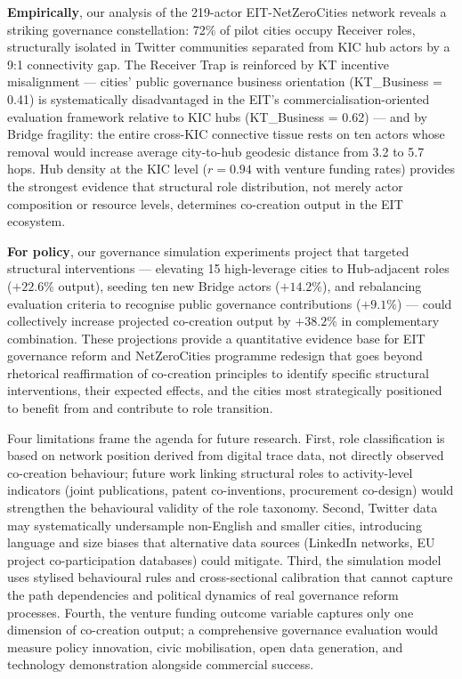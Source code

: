 \documentclass[review,12pt]{elsarticle}
\begin{document}
\textbf{Empirically}, our analysis of the 219-actor EIT-NetZeroCities network reveals a striking governance constellation: 72\% of pilot cities occupy Receiver roles, structurally isolated in Twitter communities separated from KIC hub actors by a 9:1 connectivity gap. The Receiver Trap is reinforced by KT incentive misalignment --- cities' public governance business orientation (KT\_Business = 0.41) is systematically disadvantaged in the EIT's commercialisation-oriented evaluation framework relative to KIC hubs (KT\_Business = 0.62) --- and by Bridge fragility: the entire cross-KIC connective tissue rests on ten actors whose removal would increase average city-to-hub geodesic distance from 3.2 to 5.7 hops. Hub density at the KIC level ($r = 0.94$ with venture funding rates) provides the strongest evidence that structural role distribution, not merely actor composition or resource levels, determines co-creation output in the EIT ecosystem.

\textbf{For policy}, our governance simulation experiments project that targeted structural interventions --- elevating 15 high-leverage cities to Hub-adjacent roles ($+22.6\%$ output), seeding ten new Bridge actors ($+14.2\%$), and rebalancing evaluation criteria to recognise public governance contributions ($+9.1\%$) --- could collectively increase projected co-creation output by $+38.2\%$ in complementary combination. These projections provide a quantitative evidence base for EIT governance reform and NetZeroCities programme redesign that goes beyond rhetorical reaffirmation of co-creation principles to identify specific structural interventions, their expected effects, and the cities most strategically positioned to benefit from and contribute to role transition.

Four limitations frame the agenda for future research. First, role classification is based on network position derived from digital trace data, not directly observed co-creation behaviour; future work linking structural roles to activity-level indicators (joint publications, patent co-inventions, procurement co-design) would strengthen the behavioural validity of the role taxonomy. Second, Twitter data may systematically undersample non-English and smaller cities, introducing language and size biases that alternative data sources (LinkedIn networks, EU project co-participation databases) could mitigate. Third, the simulation model uses stylised behavioural rules and cross-sectional calibration that cannot capture the path dependencies and political dynamics of real governance reform processes. Fourth, the venture funding outcome variable captures only one dimension of co-creation output; a comprehensive governance evaluation would measure policy innovation, civic mobilisation, open data generation, and technology demonstration alongside commercial success.
\end{document}
